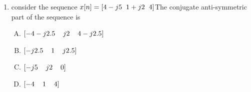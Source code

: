 \documentclass[journal,12pt,twocolumn]{IEEEtran}
\begin{document}
\begin{enumerate}
%
%
%

%
%
%

\item consider the sequence $x[n]=[4-j5\hspace{2mm}1+j2 \hspace{2mm}4]$\newline The conjugate anti-symmetric part of the sequence is
\begin{enumerate}[(A)]

\setlength\itemsep{1em}
\item $
[-4-j2.5\hspace{4mm}j2 \hspace{4mm}4-j2.5]
$
\item $
[-j2.5\hspace{4mm}1\hspace{4mm}j2.5]
$
\item $
[-j5\hspace{4mm}j2 \hspace{4mm}0]
$
\item $
[-4\hspace{4mm}1 \hspace{4mm}4]
$


\end{enumerate}
\end{enumerate}
\end{document}
